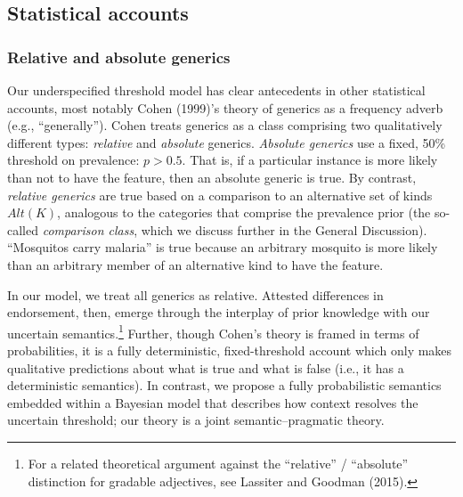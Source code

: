 \documentclass[english,,man,floatsintext]{apa6}
\let\rmarkdownfootnote\footnote%
\def\footnote{\protect\rmarkdownfootnote}
\theoremstyle{definition}
\theoremstyle{definition}
\theoremstyle{definition}
\theoremstyle{remark}
\begin{document}
\hypertarget{statistical-accounts}{%
\subsection{Statistical accounts}\label{statistical-accounts}}

\hypertarget{relative-and-absolute-generics}{%
\subsubsection{Relative and absolute
generics}\label{relative-and-absolute-generics}}

Our underspecified threshold model has clear antecedents in other
statistical accounts, most notably Cohen (1999)'s theory of generics as
a frequency adverb (e.g., \enquote{generally}). Cohen treats generics as
a class comprising two qualitatively different types: \emph{relative}
and \emph{absolute} generics. \emph{Absolute generics} use a fixed, 50\%
threshold on prevalence: \(p>0.5\). That is, if a particular instance is
more likely than not to have the feature, then an absolute generic is
true. By contrast, \emph{relative generics} are true based on a
comparison to an alternative set of kinds \(Alt(K)\), analogous to the
categories that comprise the prevalence prior (the so-called
\emph{comparison class}, which we discuss further in the General
Discussion). \enquote{Mosquitos carry malaria} is true because an
arbitrary mosquito is more likely than an arbitrary member of an
alternative kind to have the feature.

In our model, we treat all generics as relative. Attested differences in
endorsement, then, emerge through the interplay of prior knowledge with
our uncertain semantics.\footnote{For a related theoretical argument
  against the \enquote{relative} / \enquote{absolute} distinction for
  gradable adjectives, see Lassiter and Goodman (2015).} Further, though
Cohen's theory is framed in terms of probabilities, it is a fully
deterministic, fixed-threshold account which only makes qualitative
predictions about what is true and what is false (i.e., it has a
deterministic semantics). In contrast, we propose a fully probabilistic
semantics embedded within a Bayesian model that describes how context
resolves the uncertain threshold; our theory is a joint
semantic--pragmatic theory.
\end{document}
